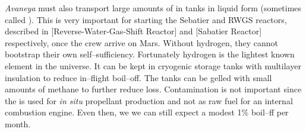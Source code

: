 {\it Avaneya} must also transport large amounts of  in tanks in liquid form (sometimes called ). This is very important for starting the Sebatier and RWGS reactors, described in [Reverse-Water-Gas-Shift Reactor] and [Sabatier Reactor] respectively, once the crew arrive on Mars. Without hydrogen, they cannot bootstrap their own self--sufficiency. Fortunately hydrogen is the lightest known element in the universe. It can be kept in cryogenic storage tanks with multilayer insulation to reduce in--flight boil--off. The tanks can be gelled with small amounts of methane to further reduce loss. Contamination is not important since the  is used for {\it in situ} propellant production and not as raw fuel for an internal combustion engine. Even then, we we can still expect a modest 1\% boil--ff per month.

